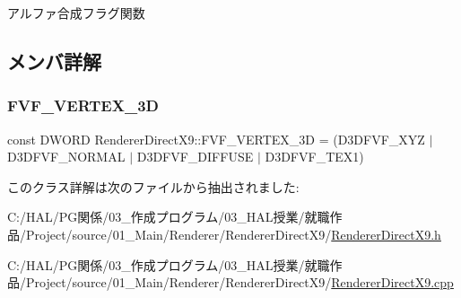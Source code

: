 アルファ合成フラグ関数 



\subsection{メンバ詳解}
\mbox{\label{class_renderer_direct_x9_a80ce0089b01354986332553353625da6}} 
\subsubsection{\texorpdfstring{F\+V\+F\+\_\+\+V\+E\+R\+T\+E\+X\+\_\+3D}{FVF\_VERTEX\_3D}}
{\footnotesize\ttfamily const D\+W\+O\+RD Renderer\+Direct\+X9\+::\+F\+V\+F\+\_\+\+V\+E\+R\+T\+E\+X\+\_\+3D = (D3\+D\+F\+V\+F\+\_\+\+X\+YZ $\vert$ D3\+D\+F\+V\+F\+\_\+\+N\+O\+R\+M\+AL $\vert$ D3\+D\+F\+V\+F\+\_\+\+D\+I\+F\+F\+U\+SE $\vert$ D3\+D\+F\+V\+F\+\_\+\+T\+E\+X1)\hspace{0.3cm}{\ttfamily [static]}}



このクラス詳解は次のファイルから抽出されました\+:\begin{DoxyCompactItemize}
\item 
C\+:/\+H\+A\+L/\+P\+G関係/03\+\_\+作成プログラム/03\+\_\+\+H\+A\+L授業/就職作品/\+Project/source/01\+\_\+\+Main/\+Renderer/\+Renderer\+Direct\+X9/\mbox{\hyperlink{_renderer_direct_x9_8h}{Renderer\+Direct\+X9.\+h}}\item 
C\+:/\+H\+A\+L/\+P\+G関係/03\+\_\+作成プログラム/03\+\_\+\+H\+A\+L授業/就職作品/\+Project/source/01\+\_\+\+Main/\+Renderer/\+Renderer\+Direct\+X9/\mbox{\hyperlink{_renderer_direct_x9_8cpp}{Renderer\+Direct\+X9.\+cpp}}\end{DoxyCompactItemize}
